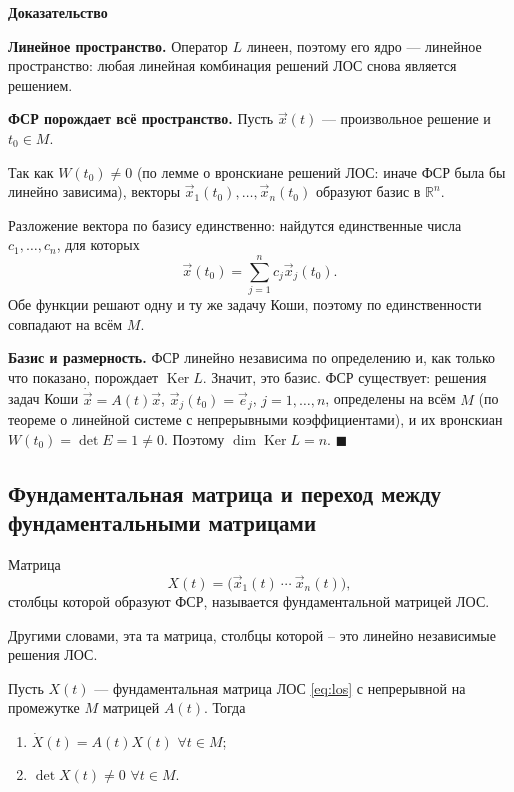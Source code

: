 \documentclass[12pt,a4paper]{article}
\numberwithin{equation}{section}
\newcommand{\vect}[1]{\vec{#1}}
\renewenvironment{proof}[1][Доказательство]{\begin{center}\textbf{#1}\end{center}}{\hfill$\blacksquare$\par}
\begin{document}
\begin{proof}
\textbf{Линейное пространство.} Оператор $L$ линеен, поэтому его ядро --- линейное пространство: любая линейная комбинация решений ЛОС снова является решением.

\textbf{ФСР порождает всё пространство.} Пусть $\vect{x}(t)$ --- произвольное решение и $t_0\in M$.

Так как \(W(t_0)\neq0\) (по лемме о вронскиане решений ЛОС: иначе ФСР была бы линейно зависима), векторы $\vect{x}_1(t_0),\ldots,\vect{x}_n(t_0)$ образуют базис в \(\mathbb{R}^n\).

Разложение вектора по базису единственно: найдутся единственные числа $c_1,\ldots,c_n$, для которых
\[
\vect{x}(t_0)=\sum_{j=1}^{n}c_j\vect{x}_j(t_0).
\]
Обе функции решают одну и ту же задачу Коши, поэтому по единственности совпадают на всём $M$.

\textbf{Базис и размерность.} ФСР линейно независима по определению и, как только что показано, порождает \(\operatorname{Ker}L\). Значит, это базис. ФСР существует: решения задач Коши \(\dot{\vect{x}}=A(t)\vect{x}\), \(\vect{x}_j(t_0)=\vect{e}_j\), \(j=1,\ldots,n\), определены на всём \(M\) (по теореме о линейной системе с непрерывными коэффициентами), и их вронскиан \(W(t_0)=\det E=1\neq0\). Поэтому \(\dim\operatorname{Ker}L=n\).
\end{proof}

\subsection{Фундаментальная матрица и переход между фундаментальными матрицами}

\begin{definitionHSE}
Матрица
\[
X(t)=\bigl(\vect{x}_1(t)\ \cdots\ \vect{x}_n(t)\bigr),
\]
столбцы которой образуют ФСР, называется фундаментальной матрицей ЛОС.
\end{definitionHSE}
Другими словами, эта та матрица, столбцы которой -- это линейно независимые решения ЛОС.

\begin{theoremHSE}
Пусть $X(t)$ --- фундаментальная матрица ЛОС \eqref{eq:los} с непрерывной на промежутке $M$ матрицей $A(t)$. Тогда
\begin{enumerate}
\item \(\dot X(t)=A(t)X(t)\) \(\forall t\in M\);
\item \(\det X(t)\neq0\) \(\forall t\in M\).
\end{enumerate}
\end{theoremHSE}
\end{document}
